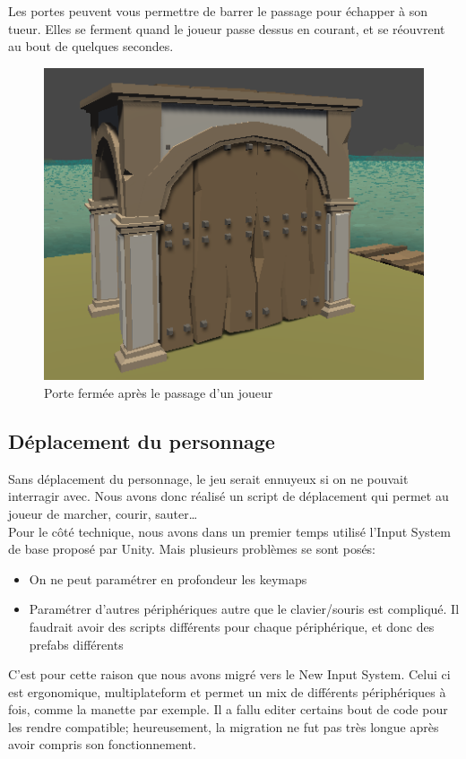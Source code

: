 \documentclass[french, 12pt]{article}
\begin{document}
            Les portes peuvent vous permettre de barrer le passage pour échapper à son tueur. Elles se ferment quand le joueur passe dessus en courant,
            et se réouvrent au bout de quelques secondes.

            \begin{figure}[hbt!]
                \centering
                \includegraphics{doors_closed.png}
                \caption{Porte fermée après le passage d'un joueur}
            \end{figure}

        \subsection{Déplacement du personnage}
        
            Sans déplacement du personnage, le jeu serait ennuyeux si on ne pouvait interragir avec.
            Nous avons donc réalisé un script de déplacement qui permet au joueur de marcher, courir, sauter\dots\\

            Pour le côté technique, nous avons dans un premier temps utilisé l'Input System de base proposé par Unity. Mais plusieurs problèmes se sont posés:
            \begin{itemize}
                \item On ne peut paramétrer en profondeur les keymaps
                \item Paramétrer d'autres périphériques autre que le clavier/souris est compliqué. Il faudrait avoir des scripts différents pour chaque périphérique, et donc des prefabs différents
            \end{itemize}
            C'est pour cette raison que nous avons migré vers le New Input System.
            Celui ci est ergonomique, multiplateform et permet un mix de différents périphériques à fois, comme la manette par exemple.
            Il a fallu editer certains bout de code pour les rendre compatible; heureusement, la migration ne fut pas très longue après avoir compris son fonctionnement.
\end{document}
